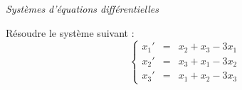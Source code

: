 \documentclass[a4paper,10pt]{report}
\begin{document}
%
%
%
%
%
%

\medskip

\begin{center}
\textit{{ {\large Systèmes d'équations différentielles}}}
\end{center}

\medskip

\begin{Exercice}{} Résoudre le système suivant :
$$\left\{\begin{array}{rcl}
x_1' & = & x_2 + x_3 - 3x_1 \\
x_2' & = & x_3 + x_1 -3 x_2 \\
x_3' &= & x_1 + x_2 -3 x_3\end{array}\right.$$
\end{Exercice}
\end{document}
